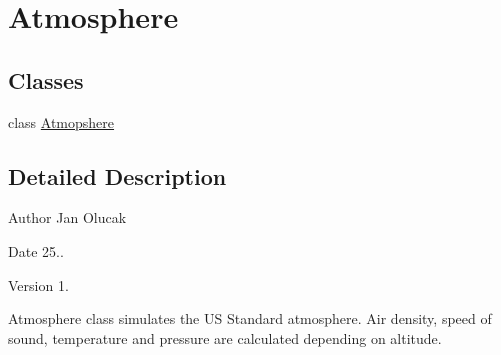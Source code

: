 \hypertarget{group___atmosphere}{}\section{Atmosphere}
\label{group___atmosphere}
\subsection*{Classes}
\begin{DoxyCompactItemize}
\item 
class \hyperlink{class_atmopshere}{Atmopshere}
\end{DoxyCompactItemize}


\subsection{Detailed Description}
\begin{DoxyAuthor}{Author}
Jan Olucak 
\end{DoxyAuthor}
\begin{DoxyDate}{Date}
25.. 
\end{DoxyDate}
\begin{DoxyVersion}{Version}
1.
\end{DoxyVersion}
Atmosphere class simulates the US Standard atmosphere. Air density, speed of sound, temperature and pressure are calculated depending on altitude. 